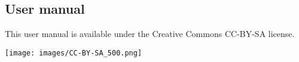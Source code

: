\subsection*{User manual}
This user manual is available under the Creative Commons CC-BY-SA license.

\begin{center}
	\texttt{[image: images/CC-BY-SA\_500.png]}
\end{center}









